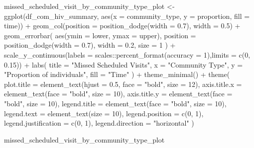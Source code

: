 \documentclass[
  letterpaper,
  DIV=11,
  numbers=noendperiod]{scrartcl}
\newenvironment{Shaded}{\begin{snugshade}}{\end{snugshade}}
\newcommand{\AttributeTok}[1]{\textcolor[rgb]{0.40,0.45,0.13}{#1}}
\newcommand{\DecValTok}[1]{\textcolor[rgb]{0.68,0.00,0.00}{#1}}
\newcommand{\FloatTok}[1]{\textcolor[rgb]{0.68,0.00,0.00}{#1}}
\newcommand{\FunctionTok}[1]{\textcolor[rgb]{0.28,0.35,0.67}{#1}}
\newcommand{\NormalTok}[1]{\textcolor[rgb]{0.00,0.23,0.31}{#1}}
\newcommand{\OtherTok}[1]{\textcolor[rgb]{0.00,0.23,0.31}{#1}}
\newcommand{\SpecialCharTok}[1]{\textcolor[rgb]{0.37,0.37,0.37}{#1}}
\newcommand{\StringTok}[1]{\textcolor[rgb]{0.13,0.47,0.30}{#1}}
\begin{document}
\begin{Shaded}
\begin{Highlighting}[]
\NormalTok{missed\_scheduled\_visit\_by\_community\_type\_plot }\OtherTok{\textless{}{-}}  \FunctionTok{ggplot}\NormalTok{(df\_com\_hiv\_summary, }\FunctionTok{aes}\NormalTok{(}\AttributeTok{x =}\NormalTok{ community\_type, }\AttributeTok{y =}\NormalTok{ proportion, }\AttributeTok{fill =}\NormalTok{ time)) }\SpecialCharTok{+}
  \FunctionTok{geom\_col}\NormalTok{(}\AttributeTok{position =} \FunctionTok{position\_dodge}\NormalTok{(}\AttributeTok{width =} \FloatTok{0.7}\NormalTok{), }\AttributeTok{width =} \FloatTok{0.5}\NormalTok{) }\SpecialCharTok{+}
  \FunctionTok{geom\_errorbar}\NormalTok{(}
    \FunctionTok{aes}\NormalTok{(}\AttributeTok{ymin =}\NormalTok{ lower, }\AttributeTok{ymax =}\NormalTok{ upper),}
    \AttributeTok{position =} \FunctionTok{position\_dodge}\NormalTok{(}\AttributeTok{width =} \FloatTok{0.7}\NormalTok{),}
    \AttributeTok{width =} \FloatTok{0.2}\NormalTok{,}
    \AttributeTok{size =} \DecValTok{1}
\NormalTok{  ) }\SpecialCharTok{+}
  \FunctionTok{scale\_y\_continuous}\NormalTok{(}\AttributeTok{labels =}\NormalTok{ scales}\SpecialCharTok{::}\FunctionTok{percent\_format}\NormalTok{(}\AttributeTok{accuracy =} \DecValTok{1}\NormalTok{),}\AttributeTok{limits =} \FunctionTok{c}\NormalTok{(}\DecValTok{0}\NormalTok{, }\FloatTok{0.15}\NormalTok{)) }\SpecialCharTok{+}
  \FunctionTok{labs}\NormalTok{(}
    \AttributeTok{title =} \StringTok{"Missed Scheduled Visits"}\NormalTok{,}
    \AttributeTok{x =} \StringTok{"Community Type"}\NormalTok{,}
    \AttributeTok{y =} \StringTok{"Proportion of individuals"}\NormalTok{,}
    \AttributeTok{fill =} \StringTok{"Time"}
\NormalTok{  ) }\SpecialCharTok{+}
  \FunctionTok{theme\_minimal}\NormalTok{() }\SpecialCharTok{+}
  \FunctionTok{theme}\NormalTok{(}
    \AttributeTok{plot.title =} \FunctionTok{element\_text}\NormalTok{(}\AttributeTok{hjust =} \FloatTok{0.5}\NormalTok{, }\AttributeTok{face =} \StringTok{"bold"}\NormalTok{, }\AttributeTok{size =} \DecValTok{12}\NormalTok{),}
    \AttributeTok{axis.title.x =} \FunctionTok{element\_text}\NormalTok{(}\AttributeTok{face =} \StringTok{"bold"}\NormalTok{, }\AttributeTok{size =} \DecValTok{10}\NormalTok{),}
    \AttributeTok{axis.title.y =} \FunctionTok{element\_text}\NormalTok{(}\AttributeTok{face =} \StringTok{"bold"}\NormalTok{, }\AttributeTok{size =} \DecValTok{10}\NormalTok{),}
    \AttributeTok{legend.title =} \FunctionTok{element\_text}\NormalTok{(}\AttributeTok{face =} \StringTok{"bold"}\NormalTok{, }\AttributeTok{size =} \DecValTok{10}\NormalTok{),}
    \AttributeTok{legend.text =} \FunctionTok{element\_text}\NormalTok{(}\AttributeTok{size =} \DecValTok{10}\NormalTok{),}
    \AttributeTok{legend.position =} \FunctionTok{c}\NormalTok{(}\DecValTok{0}\NormalTok{, }\DecValTok{1}\NormalTok{),}
    \AttributeTok{legend.justification =} \FunctionTok{c}\NormalTok{(}\DecValTok{0}\NormalTok{, }\DecValTok{1}\NormalTok{),}
    \AttributeTok{legend.direction =} \StringTok{"horizontal"}
\NormalTok{  )}

\NormalTok{missed\_scheduled\_visit\_by\_community\_type\_plot}
\end{Highlighting}
\end{Shaded}
\end{document}
